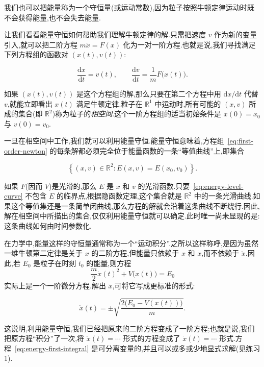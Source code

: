 我们也可以把能量称为一个守恒量(或运动常数),因为粒子按照牛顿定律运动时既不会获得能量,也不会失去能量.

让我们看看能量守恒如何帮助我们理解牛顿定律的解.只需把速度 $v$ 作为新的变量引入,就可以把二阶方程 $m\ddot{x}=F(x)$ 化为一对一阶方程.也就是说,我们寻找满足下列方程组的函数对 $(x(t),v(t))$:

\begin{equation}
  \frac{\mathrm{d}x}{\mathrm{d}t}=v(t),\qquad
  \frac{\mathrm{d}v}{\mathrm{d}t}=\frac{1}{m}F\bigl(x(t)\bigr).
  \label{eq:first-order-newton}
\end{equation}

如果 $(x(t),v(t))$ 是这个方程组的解,那么只要在第二个方程中用 $\mathrm{d}x/\mathrm{d}t$ 代替 $v$,就能立即看出 $x(t)$ 满足牛顿定律.粒子在 $\mathbb{R}^{1}$ 中运动时,所有可能的 $(x,v)$ 所成的集合(即 $\mathbb{R}^{2}$)称为粒子的\emph{相空间}.这个一阶方程组的适当初始条件是 $x(0)=x_{0}$ 与 $v(0)=v_{0}$.

一旦在相空间中工作,我们就可以利用能量守恒.能量守恒意味着,方程组~\eqref{eq:first-order-newton} 的每条解都必须完全位于能量函数的一条“等值曲线”上,即集合

\begin{equation}
  \left\{(x,v)\in\mathbb{R}^{2}:E(x,v)=E(x_{0},v_{0})\right\}.
  \label{eq:energy-level-curve}
\end{equation}

如果 $F$(因而 $V$)是光滑的,那么 $E$ 是 $x$ 和 $v$ 的光滑函数.只要~\eqref{eq:energy-level-curve} 不包含 $E$ 的临界点,根据隐函数定理,这个集合就是 $\mathbb{R}^{2}$ 中的一条光滑曲线.如果这个等值集还是一条简单闭曲线,那么方程的解就会沿着这条曲线不断绕行.因此,解在相空间中所描出的集合,仅仅利用能量守恒就可以确定.此时唯一尚未显现的是:这条曲线如何由时间参数化.

在力学中,能量这样的守恒量通常称为一个“运动积分”.之所以这样称呼,是因为虽然一维牛顿第二定律是关于 $x$ 的二阶方程,但能量只依赖于 $x$ 和 $\dot{x}$,而不依赖于 $\ddot{x}$.因此,若 $E_{0}$ 是粒子在时刻 $t_{0}$ 的能量,则方程
\[
  \frac{m}{2}\dot{x}(t)^{2}+V\bigl(x(t)\bigr)=E_{0}
\]
实际上是一个一阶微分方程.解出 $\dot{x}$,可将它写成更标准的形式:

\begin{equation}
  \dot{x}(t)=\pm\sqrt{\frac{2\bigl(E_{0}-V(x(t))\bigr)}{m}}.
  \label{eq:energy-first-integral}
\end{equation}

这说明,利用能量守恒,我们已经把原来的二阶方程变成了一阶方程;也就是说,我们把原方程“积分”了一次,将 $\ddot{x}(t)=\cdots$ 形式的方程变成了 $\dot{x}(t)=\cdots$ 形式.方程~\eqref{eq:energy-first-integral} 是可分离变量的,并且可以或多或少地显式求解(见练习 1).

